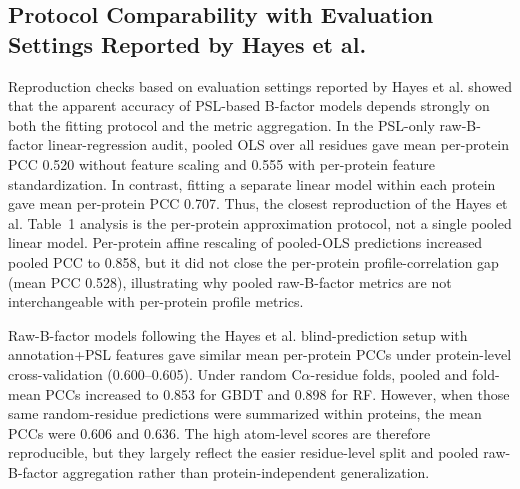\documentclass[11pt]{article}
\newcommand{\calpha}{C\ensuremath{\alpha}\xspace}
\begin{document}
\begin{table}[htbp]
\centering
\caption{PSL descriptor and model sensitivity.}
\label{tab:model_sensitivity}
\end{table}

\subsection{Protocol Comparability with Evaluation Settings Reported by Hayes et al.}
Reproduction checks based on evaluation settings reported by Hayes et al. showed that the apparent accuracy of PSL-based B-factor models depends strongly on both the fitting protocol and the metric aggregation. In the PSL-only raw-B-factor linear-regression audit, pooled OLS over all residues gave mean per-protein PCC 0.520 without feature scaling and 0.555 with per-protein feature standardization. In contrast, fitting a separate linear model within each protein gave mean per-protein PCC 0.707. Thus, the closest reproduction of the Hayes et al. Table~1 analysis is the per-protein approximation protocol, not a single pooled linear model. Per-protein affine rescaling of pooled-OLS predictions increased pooled PCC to 0.858, but it did not close the per-protein profile-correlation gap (mean PCC 0.528), illustrating why pooled raw-B-factor metrics are not interchangeable with per-protein profile metrics.

Raw-B-factor models following the Hayes et al. blind-prediction setup with annotation+PSL features gave similar mean per-protein PCCs under protein-level
cross-validation (0.600--0.605). Under random \calpha-residue folds, pooled and fold-mean PCCs increased to 0.853 for GBDT and 0.898 for RF. However, when those same random-residue predictions were summarized within proteins, the mean PCCs were 0.606 and 0.636. The high atom-level scores are therefore reproducible, but they largely reflect the easier residue-level split and pooled raw-B-factor aggregation rather than protein-independent generalization.
\end{document}
